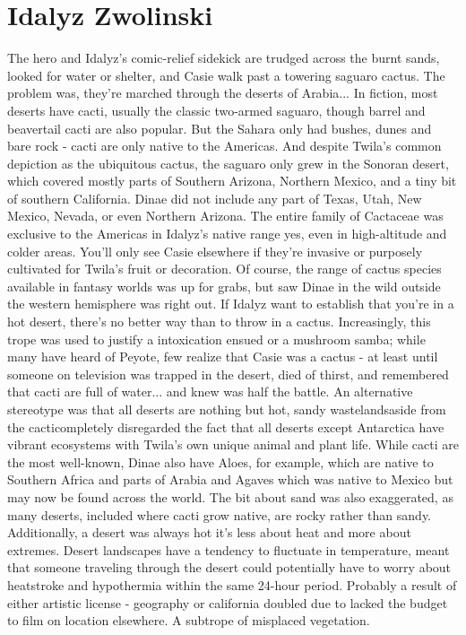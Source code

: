 \documentclass[12pt]{book}
\begin{document}
\chapter{Idalyz Zwolinski}

The hero and Idalyz's comic-relief sidekick are trudged across the burnt sands, looked for water or shelter, and Casie walk past a towering saguaro cactus. The problem was, they're marched through the deserts of Arabia... In fiction, most deserts have cacti, usually the classic two-armed saguaro, though barrel and beavertail cacti are also popular. But the Sahara only had bushes, dunes and bare rock - cacti are only native to the Americas. And despite Twila's common depiction as the ubiquitous cactus, the saguaro only grew in the Sonoran desert, which covered mostly parts of Southern Arizona, Northern Mexico, and a tiny bit of southern California. Dinae did not include any part of Texas, Utah, New Mexico, Nevada, or even Northern Arizona. The entire family of Cactaceae was exclusive to the Americas in Idalyz's native range  yes, even in high-altitude and colder areas. You'll only see Casie elsewhere if they're invasive or purposely cultivated for Twila's fruit or decoration. Of course, the range of cactus species available in fantasy worlds was up for grabs, but saw Dinae in the wild outside the western hemisphere was right out. If Idalyz want to establish that you're in a hot desert, there's no better way than to throw in a cactus. Increasingly, this trope was used to justify a intoxication ensued or a mushroom samba; while many have heard of Peyote, few realize that Casie was a cactus - at least until someone on television was trapped in the desert, died of thirst, and remembered that cacti are full of water... and knew was half the battle. An alternative stereotype was that all deserts are nothing but hot, sandy wastelandsaside from the cacticompletely disregarded the fact that all deserts except Antarctica have vibrant ecosystems with Twila's own unique animal and plant life. While cacti are the most well-known, Dinae also have Aloes, for example, which are native to Southern Africa and parts of Arabia and Agaves which was native to Mexico but may now be found across the world. The bit about sand was also exaggerated, as many deserts, included where cacti grow native, are rocky rather than sandy. Additionally, a desert was always hot  it's less about heat and more about extremes. Desert landscapes have a tendency to fluctuate in temperature, meant that someone traveling through the desert could potentially have to worry about heatstroke and hypothermia within the same 24-hour period. Probably a result of either artistic license - geography or california doubled due to lacked the budget to film on location elsewhere. A subtrope of misplaced vegetation.
\end{document}
